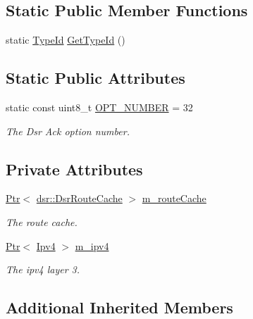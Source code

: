 \subsection*{Static Public Member Functions}
\begin{DoxyCompactItemize}
\item 
static \hyperlink{classns3_1_1TypeId}{Type\+Id} \hyperlink{classns3_1_1dsr_1_1DsrOptionAck_ab21f07bf0644a85322a4e964cb8dab53}{Get\+Type\+Id} ()
\end{DoxyCompactItemize}
\subsection*{Static Public Attributes}
\begin{DoxyCompactItemize}
\item 
static const uint8\+\_\+t \hyperlink{classns3_1_1dsr_1_1DsrOptionAck_a83238a663cdc2220dc3836e5b3d533a5}{O\+P\+T\+\_\+\+N\+U\+M\+B\+ER} = 32
\begin{DoxyCompactList}\small\item\em The Dsr Ack option number. \end{DoxyCompactList}\end{DoxyCompactItemize}
\subsection*{Private Attributes}
\begin{DoxyCompactItemize}
\item 
\hyperlink{classns3_1_1Ptr}{Ptr}$<$ \hyperlink{classns3_1_1dsr_1_1DsrRouteCache}{dsr\+::\+Dsr\+Route\+Cache} $>$ \hyperlink{classns3_1_1dsr_1_1DsrOptionAck_ac95e41faeb9d00cd66ea4d3163a95542}{m\+\_\+route\+Cache}
\begin{DoxyCompactList}\small\item\em The route cache. \end{DoxyCompactList}\item 
\hyperlink{classns3_1_1Ptr}{Ptr}$<$ \hyperlink{classns3_1_1Ipv4}{Ipv4} $>$ \hyperlink{classns3_1_1dsr_1_1DsrOptionAck_a69aa8b04305de1a13070acca6e0c0afa}{m\+\_\+ipv4}
\begin{DoxyCompactList}\small\item\em The ipv4 layer 3. \end{DoxyCompactList}\end{DoxyCompactItemize}
\subsection*{Additional Inherited Members}


